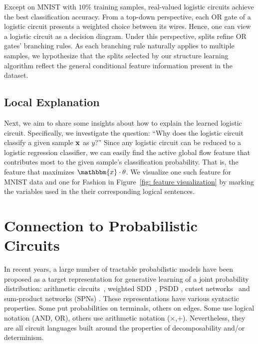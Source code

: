 \documentclass[letterpaper]{article} %
\newcommand{\sample}{{\bf x}}
\begin{document}
Except on MNIST with $10\%$ training samples, real-valued logistic circuits achieve the best classification accuracy. From a top-down perspective, each OR gate of a logistic circuit presents a weighted choice between its wires. Hence, one can view a logistic circuit as a decision diagram.
Under this perspective, splits refine OR gates' branching rules. As each branching rule naturally applies to multiple samples, we hypothesize that the splits selected by our structure learning algorithm reflect the general conditional feature information present in the dataset.



\subsection{Local Explanation}
\label{s: interpretability}
Next, we aim to share some insights about how to explain the learned logistic circuit. Specifically, we investigate the question: ``Why does the logistic circuit classify a given sample $\sample$ as $y$?'' Since any logistic circuit can be reduced to a logistic regression classifier, we can easily find the active global flow feature that contributes most to the given sample's classification probability. That is, the feature that maximizes $\mathbbm{x}\cdot\theta$. We visualize one such feature for MNIST data and one for Fashion in Figure~\ref{fig: feature visualization} by marking the variables used in the their corresponding logical sentences.



\section{Connection to Probabilistic Circuits} \label{s:generativeconnection}
In recent years, a large number of tractable probabilistic models have been proposed as a target representation for generative learning of a joint probability distribution: arithmetic circuits~\cite{lowd:uai08}, weighted SDD~\cite{BekkerNIPS15}, PSDD \cite{KisaVCD14}, cutset networks~\cite{rahman2014cutset} and sum-product networks (SPNs) \cite{poon2011sum}.
These representations have various syntactic properties. Some put probabilities on terminals, others on edges. Some use logical notation (AND, OR), others use arithmetic notation ($\times$,$+$).
Nevertheless, they are all circuit languages built around the properties of decomposability and/or determinism.
\end{document}
